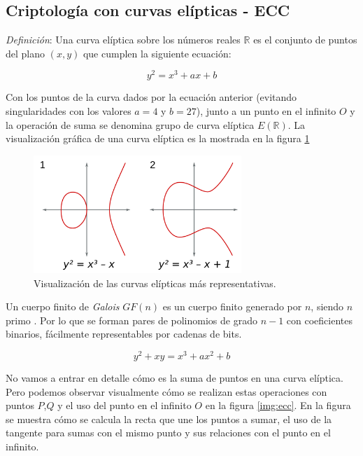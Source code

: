 \documentclass[../PFC.tex]{subfiles}
\begin{document}
\subsection{Criptología con curvas elípticas - ECC}
\label{Criptología con curvas elípticas - ECC}

\textit{Definición}: Una curva elíptica sobre los números reales $\mathbb{R}$ es el conjunto de puntos del plano $(x , y)$ que cumplen la siguiente ecuación\cite{bruce}:

\begin{equation}
y^2 = x^3 + ax + b
\end{equation}

Con los puntos de la curva dados por la ecuación anterior (evitando singularidades con los valores $a = 4$ y $b = 27$), junto a un punto en el infinito $O$ y la operación de suma se denomina grupo de curva elíptica $E(\mathbb{R})$. La visualización gráfica de una curva elíptica es la mostrada en la figura \ref{img:ec}

\begin{figure}[H]
  \centering
  \includegraphics[width=0.7\textwidth]{./img/EC}
  \caption{Visualización de las curvas elípticas más representativas.}
  \label{img:ec}
\end{figure}

Un cuerpo finito de \textit{Galois} $GF(n)$ es un cuerpo finito generado por $n$, siendo $n$ primo \cite{lucena}. Por lo que se forman pares de polinomios de grado $n-1$ con coeficientes binarios, fácilmente representables por cadenas de bits\cite{lucena}. %

\begin{equation}
y^2 + xy = x^3 + ax^2 + b
\end{equation}

No vamos a entrar en detalle cómo es la suma de puntos en una curva elíptica. Pero podemos observar visualmente cómo se realizan estas operaciones con puntos $P$,$Q$ y el uso del punto en el infinito $O$ en la figura \ref{img:ecc}. En la figura se muestra cómo se calcula la recta que une los puntos a sumar, el uso de la tangente para sumas con el mismo punto y sus relaciones con el punto en el infinito.
\end{document}
